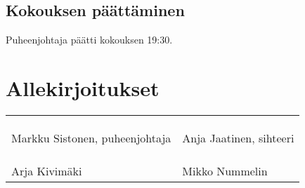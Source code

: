 \documentclass[a4paper,12pt]{article}
\begin{document}
\subsection{Kokouksen päättäminen}
Puheenjohtaja päätti kokouksen 19:30.
\section*{Allekirjoitukset}
\begin{flushleft}
\begin{tabular}{ll}
& \\
& \\
& \\
Markku Sistonen, puheenjohtaja &
Anja Jaatinen, sihteeri \\
& \\
& \\
& \\
Arja Kivimäki &
Mikko Nummelin
\end{tabular}
\end{flushleft}
\end{document}
